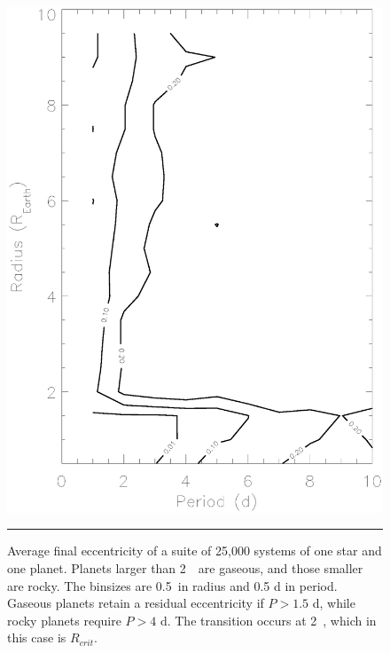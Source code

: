 \begin{figure}[t] 
  \begin{minipage}[c]{0.39\textwidth}
    \includegraphics[width=\textwidth]{figures/radper.ps}
  \end{minipage}\hfill
  \begin{minipage}[c]{0.6\textwidth}
    \caption{Average final eccentricity of a suite of 25,000
systems of one star and one planet. Planets larger than 2~\rearth~are gaseous, and 
those smaller are rocky. The binsizes are 0.5~\rearth in radius and 0.5 d in period.
Gaseous planets retain a residual eccentricity if $P > 1.5$ d, while rocky planets require
$P > 4$ d. The transition occurs at 2~\rearth, which in this case is $R_{crit}$. }
    \label{fig:radper}
    \hspace*{\fill}  
    \hrule
  \end{minipage}
\end{figure}


